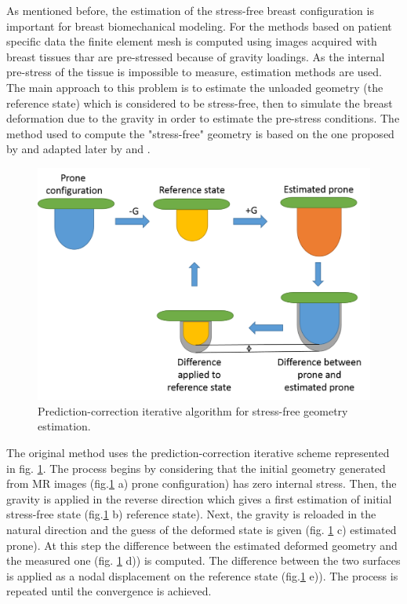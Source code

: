 As mentioned before, the estimation of the stress-free breast configuration is important for breast biomechanical modeling. For the methods based on patient specific data the finite element mesh is computed using images acquired with breast tissues thar are pre-stressed because of gravity loadings. As the internal pre-stress of the tissue is impossible to measure, estimation methods are used. The main approach to this problem is to estimate the unloaded geometry (the reference state) which is considered to be stress-free, then to simulate the breast deformation due to the gravity in order to estimate the pre-stress conditions.   The method used to compute the "stress-free" geometry is based on the one proposed by \cite{ carter_biomechanical_2009} and adapted later by \cite{eiben_breast_2014} and \cite{eder_comparison_2014}. 
\begin{center}			  
\begin{figure}[h]
\centerline{\includegraphics[width=\textwidth,height=\textheight,keepaspectratio]{figures/IFP.png} }
\caption{Prediction-correction iterative algorithm for stress-free geometry estimation.}
\label{IFP}
\end{figure}
\end{center}

The original method uses the prediction-correction iterative scheme represented in fig. \ref{IFP}. The process begins by considering that the initial geometry generated from MR images (fig.\ref{IFP} a) prone configuration) has zero internal stress. Then, the gravity is applied in the reverse direction which gives a first estimation of initial stress-free state (fig.\ref{IFP} b) reference state).
Next, the gravity is reloaded in the natural direction and the guess of the deformed state is given (fig. \ref{IFP} c) estimated prone). At this step the difference  between the estimated deformed geometry and the measured one (fig. \ref{IFP} d)) is computed. The difference between the two surfaces is applied as a nodal displacement on the reference state (fig.\ref{IFP} e)). The process is repeated until the convergence is achieved.


